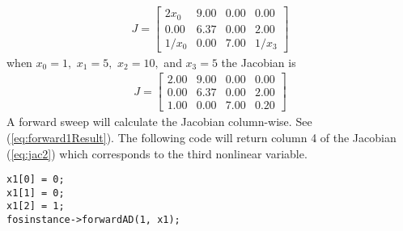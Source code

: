 \documentclass[11pt]{article}
\renewcommand{\_}{{\char"5F}}
\renewcommand{\{}{{\char"7B}}
\renewcommand{\}}{{\char"7D}}
\renewcommand{\^}{{\char"0D}}
\renewcommand{\'}{{\char"0D}}
\begin{document}
\begin{eqnarray}
J =
\left[
\begin{array}{rrrr}
2x_{0} &9.00&0.00&0.00   \\
0.00&6.37&0.00&2.00 \\
1/x_{0}&0.00&7.00&1/x_{3} 
\end{array}
\right] \label{eq:jac}
\end{eqnarray}
when $x_{0} = 1,$ $x_{1} = 5,$ $x_{2} = 10,$ and $x_{3} = 5$ the Jacobian is
\begin{eqnarray}
J =
\left[
\begin{array}{rrrr}
2.00 &9.00&0.00&0.00   \\
0.00&6.37&0.00&2.00 \\
1.00&0.00&7.00&0.20 
\end{array}
\right] \label{eq:jac2}
\end{eqnarray}
A forward sweep will calculate the Jacobian column-wise.  See 
(\ref{eq:forward1Result}).  The following code will return column 4 of the Jacobian (\ref{eq:jac2}) which corresponds to the third nonlinear variable. 
\begin{verbatim}
x1[0] = 0;
x1[1] = 0;
x1[2] = 1;
fosinstance->forwardAD(1, x1);
\end{verbatim}
\end{document}
